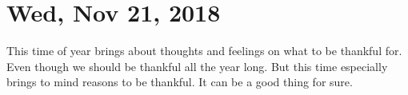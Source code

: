 \section{Wed, Nov 21, 2018}

This time of year brings about thoughts and feelings on what to be thankful for. Even
though we should be thankful all the year long. But this time especially brings to
mind reasons to be thankful. It can be a good thing for sure.